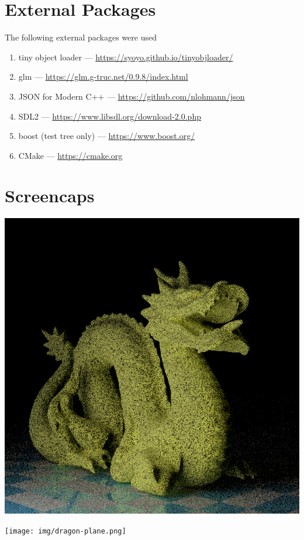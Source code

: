 \section{External Packages}
The following external packages were used 
\begin{enumerate}
    \item tiny object loader --- \url{https://syoyo.github.io/tinyobjloader/}
    \item glm --- \url{https://glm.g-truc.net/0.9.8/index.html}
    \item JSON for Modern C++ --- \url{https://github.com/nlohmann/json}
    \item SDL2 --- \url{https://www.libsdl.org/download-2.0.php}
    \item boost (test tree only) --- \url{https://www.boost.org/}
    \item CMake --- \url{https://cmake.org}
\end{enumerate}

\section{Screencaps}

\begin{center}
\begin{minipage}{0.48\linewidth}
\includegraphics[width=\linewidth]{img/dragon.png}
\end{minipage}
\begin{minipage}{0.48\linewidth}
\texttt{[image: img/dragon-plane.png]}
\end{minipage}
\end{center}

